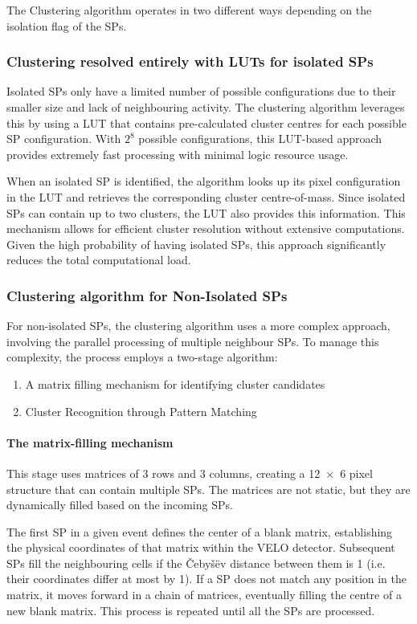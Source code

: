 The Clustering algorithm operates in two different ways depending on the isolation flag of the SPs.
\subsubsection{Clustering resolved entirely with LUTs for isolated SPs}
Isolated SPs only have a limited number of possible configurations due to their smaller size and lack of neighbouring activity. The clustering algorithm leverages this by using a LUT that contains pre-calculated cluster centres for each possible SP configuration. With $2^8$ possible configurations, this LUT-based approach provides extremely fast processing with minimal logic resource usage.

When an isolated SP is identified, the algorithm looks up its pixel configuration in the LUT and retrieves the corresponding cluster centre-of-mass. Since isolated SPs can contain up to two clusters, the LUT also provides this information. This mechanism allows for efficient cluster resolution without extensive computations. Given the high probability of having isolated SPs, this approach significantly reduces the total computational load.

\subsubsection{Clustering algorithm for Non-Isolated SPs}
For non-isolated SPs, the clustering algorithm uses a more complex approach, involving the parallel processing of multiple neighbour SPs. To manage this complexity, the process employs a two-stage algorithm\cite{Lazzari:2813167}:
\begin{enumerate}
    \item A matrix filling mechanism for identifying cluster candidates
    \item Cluster Recognition through Pattern Matching
\end{enumerate}

\paragraph{The matrix-filling mechanism}
This stage uses matrices of 3 rows and 3 columns, creating a 12~×~6 pixel structure that can contain multiple SPs. The matrices are not static, but they are dynamically filled based on the incoming SPs.

The first SP in a given event defines the center of a blank matrix, establishing the physical coordinates of that matrix within the VELO detector. Subsequent SPs fill the neighbouring cells if the Čebyšëv distance between them is 1 (i.e. their coordinates differ at most by 1). If a SP does not match any position in the matrix, it moves forward in a chain of matrices, eventually filling the centre of a new blank matrix. This process is repeated until all the SPs are processed.

